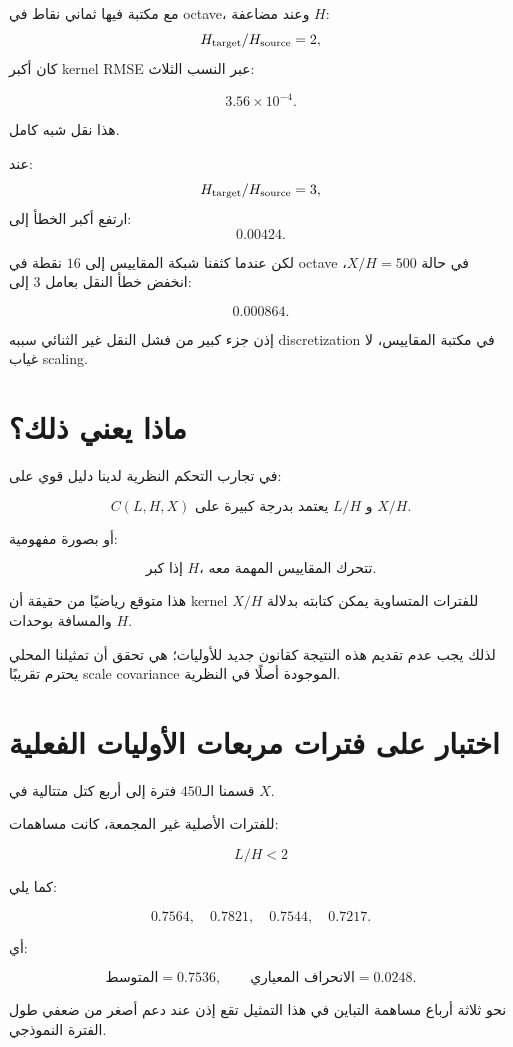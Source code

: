 \documentclass[12pt]{article}
\begin{document}
مع مكتبة فيها ثماني نقاط في octave، وعند مضاعفة \(H\):
\[
H_{\rm target}/H_{\rm source}=2,
\]
كان أكبر kernel RMSE عبر النسب الثلاث:

\[
\boxed{3.56\times10^{-4}}.
\]

هذا نقل شبه كامل.

عند:
\[
H_{\rm target}/H_{\rm source}=3,
\]
ارتفع أكبر الخطأ إلى:
\[
0.00424.
\]

لكن عندما كثفنا شبكة المقاييس إلى \(16\) نقطة في octave في حالة
\(X/H=500\)، انخفض خطأ النقل بعامل \(3\) إلى:

\[
\boxed{0.000864}.
\]

إذن جزء كبير من فشل النقل غير الثنائي سببه discretization في مكتبة
المقاييس، لا غياب scaling.

\section{ماذا يعني ذلك؟}

في تجارب التحكم النظرية لدينا دليل قوي على:

\[
\boxed{
C(L,H,X)
\text{ يعتمد بدرجة كبيرة على }
L/H
\text{ و }
X/H.
}
\]

أو بصورة مفهومية:

\[
\boxed{
\text{إذا كبر }H\text{، تتحرك المقاييس المهمة معه.}
}
\]

هذا متوقع رياضيًا من حقيقة أن kernel للفترات المتساوية يمكن كتابته
بدلالة \(X/H\) والمسافة بوحدات \(H\).

لذلك يجب عدم تقديم هذه النتيجة كقانون جديد للأوليات؛ هي تحقق أن
تمثيلنا المحلي يحترم تقريبًا scale covariance الموجودة أصلًا في النظرية.

\section{اختبار على فترات مربعات الأوليات الفعلية}

قسمنا الـ\(450\) فترة إلى أربع كتل متتالية في \(X\).

للفترات الأصلية غير المجمعة، كانت مساهمات:

\[
L/H<2
\]

كما يلي:

\[
0.7564,\quad0.7821,\quad0.7544,\quad0.7217.
\]

أي:

\[
\boxed{
\text{المتوسط}=0.7536,
\qquad
\text{الانحراف المعياري}=0.0248.
}
\]

نحو ثلاثة أرباع مساهمة التباين في هذا التمثيل تقع إذن عند دعم أصغر من
ضعفي طول الفترة النموذجي.
\end{document}

